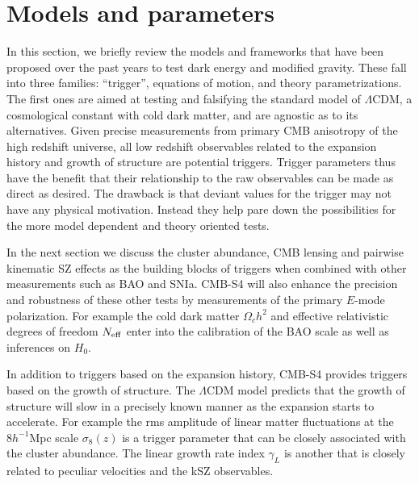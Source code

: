 \section{Models and parameters}
\label{sec:deparam}

In this section, we  briefly review the models and frameworks that have been proposed over the past years to test dark energy and modified gravity.   These fall into 
three families: ``trigger'', equations of motion, and theory parametrizations. The first ones are aimed at testing and falsifying the standard model
of $\Lambda$CDM, a cosmological constant with cold dark matter, and are agnostic as to its 
alternatives.  Given precise measurements from primary CMB anisotropy of the high redshift universe, all low redshift observables related to the expansion history and growth of
structure are potential triggers.  Trigger parameters thus have the benefit that their relationship to the raw observables can be made as direct as desired.   The drawback is 
that deviant values for the trigger may not have any physical motivation.  Instead they help pare down the possibilities for the more model
dependent and theory oriented tests.  


  In the next section we discuss the cluster abundance,
 CMB lensing and pairwise kinematic SZ effects as the building blocks of triggers when
 combined with other measurements such as BAO and SNIa.   CMB-S4 will also enhance the precision and robustness
 of these other tests by measurements of the primary $E$-mode polarization.   For example
 the cold dark matter $\Omega_c h^2$ and effective relativistic degrees of freedom $N_{\rm eff}$ enter into the calibration of the BAO scale as well as inferences on $H_0$. 
 
In addition to triggers based on the expansion history, CMB-S4 provides triggers based
on the growth of structure.  The $\Lambda$CDM model predicts that the growth of structure
will slow in a precisely known manner as the expansion starts to accelerate.   
For example the rms amplitude of linear matter fluctuations at the $8 h^{-1}$Mpc
scale $\sigma_8(z)$ is a trigger parameter that can be closely associated with the 
cluster abundance.   The linear growth rate index $\gamma_L$ is another that is closely related
to peculiar velocities and the kSZ observables.   

